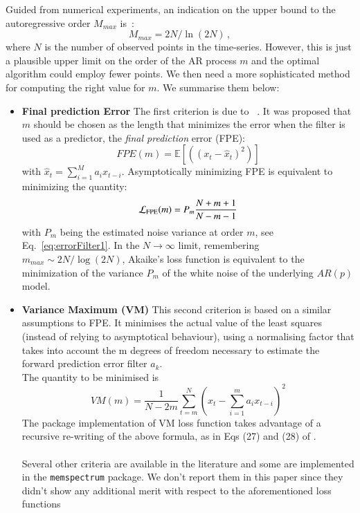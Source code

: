 \documentclass[epj,nopacs]{svjour}
\begin{document}
Guided from numerical experiments, an indication on the upper bound to the autoregressive order $M_{max}$ is~\cite{doi:10.1190/1.1440902}:
\begin{equation}\label{eq:MMAx}
M_{max} = 2N / \ln{(2N)}\,,
\end{equation}
where $N$ is the number of observed points in the time-series.
However, this is just a plausible upper limit on the order of the AR process $m$ and the optimal algorithm could employ fewer points.
We then need a more sophisticated method for computing the right value for $m$.
We summarise them below:

\begin{itemize}
\item \textbf{Final prediction Error} 
The first criterion is due to ~\cite{Akaike1970StatisticalPI}. It was proposed that $m$ should be chosen as the 
length that minimizes the error when the filter is used as a predictor, the \emph{final prediction} error (FPE): 
\begin{equation}
    FPE(m) = \mathbb{E}\left[ \left((x_t - \hat x_t) ^ 2\right) \right]
\end{equation}
with $\hat{x}_t = \sum_{i = 1}^M a_i x_{t - i}$.
Asymptotically minimizing FPE is equivalent to minimizing the quantity: 
\begin{equation}
    \mathcal{L}_{\rm FPE}(m) = P_{m} \frac{N + m + 1}{N - m - 1}
\end{equation}
with $P_m$ being the estimated noise variance at order $m$, see Eq.~\eqref{eq:errorFilter1}. In the $N \to \infty$ limit, 
remembering $m_{max} \sim 2N / \log(2N)$, Akaike's loss function is equivalent to the minimization of the variance $P_m$ of the white noise of the underlying $AR(p)$ model. 

\item \textbf{Variance Maximum (VM)}
This second criterion \cite{kay1988modern} is based on a similar assumptions to FPE. It minimises the actual value of the least squares (instead of relying to asymptotical behaviour), using a normalising factor that takes into account the m degrees of freedom necessary to estimate the forward prediction error filter $a_k$.\\ The quantity to be minimised is
\begin{equation}
VM(m) = \frac{1}{N - 2m}\sum_{t=m}^N\left(x_t - \sum_{i=1}^m a_i x_{t-i} \right)^{2}
\end{equation}
The package implementation of VM loss function takes advantage of a recursive re-writing of the above formula, as in Eqs (27) and (28) of \cite{Cuoco_2001}.  \\ \\

Several other criteria are available in the literature \cite{doi:10.1029/WR018i004p01097,bhansali1986} and some are implemented in the \texttt{memspectrum} package. We don't report them in this paper since they didn't show any additional merit with respect to the aforementioned loss functions \\
\end{itemize}
\end{document}
